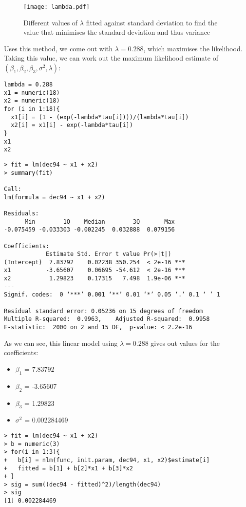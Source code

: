 \documentclass[11pt, a4paper]{article}
\begin{document}
\begin{figure}[!h]
\centering
\texttt{[image: lambda.pdf]}
\caption{Different values of $\lambda$ fitted against standard deviation to find the value that minimises the standard deviation and thus variance}
\end{figure}


Uses this method, we come out with $\lambda = 0.288$, which maximises the likelihood. Taking this value, we can work out the maximum likelihood estimate of $(\beta_{1}, \beta_{2}, \beta_{3}, \sigma^{2}, \lambda)$:

\begin{verbatim}
lambda = 0.288
x1 = numeric(18)
x2 = numeric(18)
for (i in 1:18){
  x1[i] = (1 - (exp(-lambda*tau[i])))/(lambda*tau[i])
  x2[i] = x1[i] - exp(-lambda*tau[i])
}
x1
x2
\end{verbatim}

\begin{verbatim}
> fit = lm(dec94 ~ x1 + x2)
> summary(fit)

Call:
lm(formula = dec94 ~ x1 + x2)

Residuals:
      Min        1Q    Median        3Q       Max 
-0.075459 -0.033303 -0.002245  0.032888  0.079156 

Coefficients:
            Estimate Std. Error t value Pr(>|t|)    
(Intercept)  7.83792    0.02238 350.254  < 2e-16 ***
x1          -3.65607    0.06695 -54.612  < 2e-16 ***
x2           1.29823    0.17315   7.498  1.9e-06 ***
---
Signif. codes:  0 ‘***’ 0.001 ‘**’ 0.01 ‘*’ 0.05 ‘.’ 0.1 ‘ ’ 1

Residual standard error: 0.05236 on 15 degrees of freedom
Multiple R-squared:  0.9963,	Adjusted R-squared:  0.9958 
F-statistic:  2000 on 2 and 15 DF,  p-value: < 2.2e-16
\end{verbatim}

As we can see, this linear model using $\lambda = 0.288$ gives out values for the coefficients:
\begin{itemize}
\item $\beta_{1}$ = 7.83792
\item $\beta_{2}$ = -3.65607
\item $\beta_{3}$ = 1.29823
\item $\sigma^{2}$ = 0.002284469
\end{itemize}

\begin{verbatim}
> fit = lm(dec94 ~ x1 + x2)
> b = numeric(3)
> for(i in 1:3){
+   b[i] = nlm(func, init.param, dec94, x1, x2)$estimate[i]
+   fitted = b[1] + b[2]*x1 + b[3]*x2
+ }
> sig = sum((dec94 - fitted)^2)/length(dec94)
> sig
[1] 0.002284469
\end{verbatim}
\end{document}
